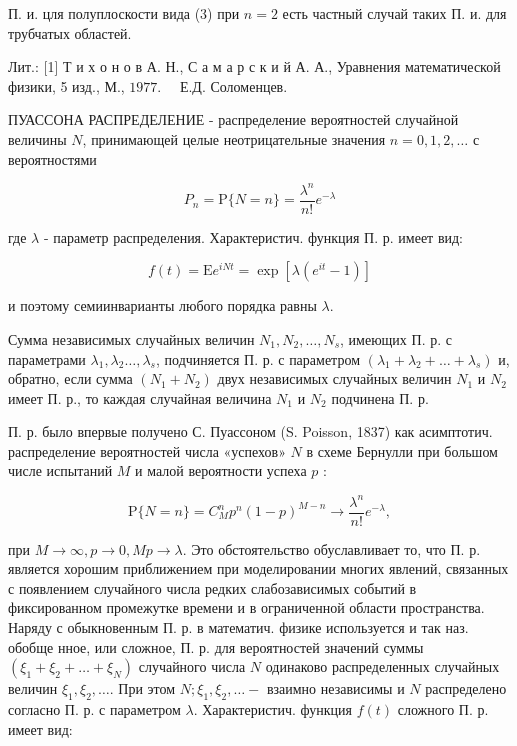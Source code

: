 \documentclass[10pt]{article}
\begin{document}
П. и. цля полуплоскости вида (3) при $n=2$ есть частный случай таких П. и. для трубчатых областей.



Лит.: [1] Т и х о н о в А. Н., С а м а р с к и й А. А., Уравнения математической физики, 5 изд., М., $1977 . \quad$ Е.Д. Соломенцев.



ПУАССОНА РАСПРЕДЕЛЕНИЕ - распределение вероятностей случайной величины $N$, принимающей целые неотрицательные значения $n=0,1,2, \ldots$ с вероятностями



\[

P_{n}=\mathrm{P}\{N=n\}=\frac{\lambda^{n}}{n !} e^{-\lambda}

\]



где $\lambda$ - параметр распределения. Характеристич. функция П. р. имеет вид:



\[

f(t)=\mathrm{E} e^{i N t}=\exp \left[\lambda\left(e^{i t}-1\right)\right]

\]



и поэтому семиинварианты любого порядка равны $\lambda$.



Сумма независимых случайных величин $N_{1}, N_{2}, \ldots, N_{s}$, имеющих П. р. с параметрами $\lambda_{1}, \lambda_{2} \ldots, \lambda_{s}$, подчиняется П. р. с параметром $\left(\lambda_{1}+\lambda_{2}+\ldots+\lambda_{s}\right)$ и, обратно, если сумма $\left(N_{1}+N_{2}\right)$ двух независимых случайных величин $N_{1}$ и $N_{2}$ имеет П. р., то каждая случайная величина $N_{1}$ и $N_{2}$ подчинена П. р.



П. р. было впервые получено С. Пуассоном (S. Poisson, 1837) как асимптотич. распределение вероятностей числа «успехов» $N$ в схеме Бернулли при большом числе испытаний $M$ и малой вероятности успеха $p$ :



\[

\mathrm{P}\{N=n\}=C_{M}^{n} p^{n}(1-p)^{M-n} \rightarrow \frac{\lambda^{n}}{n !} e^{-\lambda},

\]



при $M \rightarrow \infty, p \rightarrow 0, M p \rightarrow \lambda$. Это обстоятельство обуславливает то, что П. р. является хорошим приближением при моделировании многих явлений, связанных с появлением случайного числа редких слабозависимых событий в фиксированном промежутке времени и в ограниченной области пространства. Наряду с обыкновенным П. р. в математич. физике используется и так наз. обобще нное, или сложное, П. р. для вероятностей значений суммы $\left(\xi_{1}+\xi_{2}+\ldots+\xi_{N}\right)$ случайного числа $N$ одинаково распределенных случайных величин $\xi_{1}, \xi_{2}, \ldots$. При этом $N ; \xi_{1}, \xi_{2}, \ldots-$ взаимно независимы и $N$ распределено согласно П. р. с параметром $\lambda$. Характеристич. функция $f(t)$ сложного П. р. имеет вид:
\end{document}
